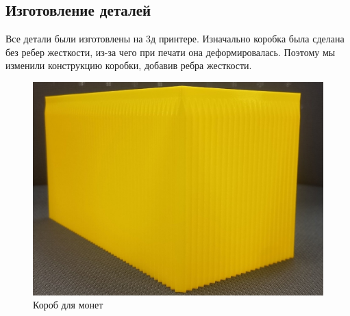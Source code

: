 \subsection{Изготовление деталей}

Все детали были изготовлены на 3д принтере. Изначально коробка была сделана без ребер жесткости, из-за чего при печати она деформировалась. 
Поэтому мы изменили конструкцию коробки, добавив ребра жесткости. 

\begin{figure}[H]
	\centering
	\includegraphics[width=12cm]{pics/korob.jpg}
	\caption{Короб для монет}
	\label{ris:korob_done}
\end{figure}
\par\medskip